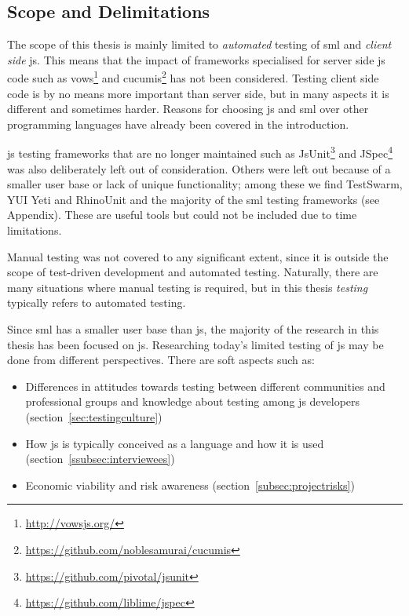 \documentclass[11pt]{article}
\begin{document}
\subsection{Scope and Delimitations}

The scope of this thesis is mainly limited to \emph{automated} testing of \gls{sml} and \emph{client side} \gls{js}. This means that the impact of frameworks specialised for server side \gls{js} code such as vows\footnote{\url{http://vowsjs.org/}} and cucumis\footnote{\url{https://github.com/noblesamurai/cucumis}} has not been considered. Testing client side code is by no means more important than server side, but in many aspects it is different and sometimes harder. Reasons for choosing \gls{js} and \gls{sml} over other programming languages have already been covered in the introduction.

\gls{js} testing frameworks that are no longer maintained such as JsUnit\footnote{\url{https://github.com/pivotal/jsunit}} and JSpec\footnote{\url{https://github.com/liblime/jspec}} was also deliberately left out of consideration. Others were left out because of a smaller user base or lack of unique functionality; among these we find TestSwarm, YUI Yeti and RhinoUnit and the majority of the \gls{sml} testing frameworks (see Appendix). These are useful tools but could not be included due to time limitations.

Manual testing was not covered to any significant extent, since it is outside the scope of test-driven development and automated testing. Naturally, there are many situations where manual testing is required, but in this thesis \emph{testing} typically refers to automated testing.

Since \gls{sml} has a smaller user base than \gls{js}, the majority of the research in this thesis has been focused on \gls{js}. Researching today's limited testing of \gls{js} may be done from different perspectives. There are soft aspects such as:
\begin{itemize}[label={--}]
\item Differences in attitudes towards testing between different communities and professional groups and knowledge about testing among \gls{js} developers (section~\ref{sec:testingculture})
\item How \gls{js} is typically conceived as a language and how it is used (section~\ref{ssubsec:interviewees})
\item Economic viability and risk awareness (section~\ref{subsec:projectrisks})
\end{itemize}
\end{document}
